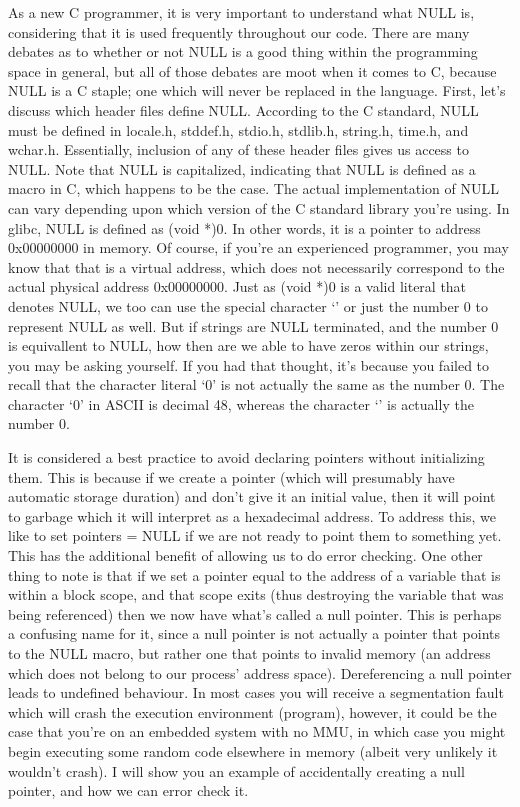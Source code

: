 \documentclass{article}
\begin{document}
As a new C programmer, it is very important to understand what NULL is, considering that it is used
frequently throughout our code. There are many debates as to whether or not NULL is a good thing within the
programming space in general, but all of those debates are moot when it comes to C, because NULL is a C
staple; one which will never be replaced in the language. First, let’s discuss which header files define
NULL. According to the C standard, NULL must be defined in locale.h, stddef.h, stdio.h, stdlib.h, string.h,
time.h, and wchar.h. Essentially, inclusion of any of these header files gives us access to NULL. Note that
NULL is capitalized, indicating that NULL is defined as a macro in C, which happens to be the case. The
actual implementation of NULL can vary depending upon which version of the C standard library you’re using.
In glibc, NULL is defined as (void *)0. In other words, it is a pointer to address 0x00000000 in memory. Of
course, if you’re an experienced programmer, you may know that that is a virtual address, which does not
necessarily correspond to the actual physical address 0x00000000. Just as (void *)0 is a valid literal that
denotes NULL, we too can use the special character ‘\0’ or just the number 0 to represent NULL as well. But
if strings are NULL terminated, and the number 0 is equivallent to NULL, how then are we able to have zeros
within our strings, you may be asking yourself. If you had that thought, it’s because you failed to recall
that the character literal ‘0’ is not actually the same as the number 0. The character ‘0’ in ASCII is
decimal 48, whereas the character ‘\0’ is actually the number 0.

It is considered a best practice to avoid declaring pointers without initializing them. This is because if we
create a pointer (which will presumably have automatic storage duration) and don’t give it an initial value,
then it will point to garbage which it will interpret as a hexadecimal address. To address this, we like to
set pointers = NULL if we are not ready to point them to something yet. This has the additional benefit of
allowing us to do error checking. One other thing to note is that if we set a pointer equal to the address of
a variable that is within a block scope, and that scope exits (thus destroying the variable that was being
referenced) then we now have what’s called a null pointer. This is perhaps a confusing name for it, since a
null pointer is not actually a pointer that points to the NULL macro, but rather one that points to invalid
memory (an address which does not belong to our process’ address space). Dereferencing a null pointer leads
to undefined behaviour. In most cases you will receive a segmentation fault which will crash the execution
environment (program), however, it could be the case that you’re on an embedded system with no MMU, in which
case you might begin executing some random code elsewhere in memory (albeit very unlikely it wouldn’t crash).
I will show you an example of accidentally creating a null pointer, and how we can error check it.
\end{document}
